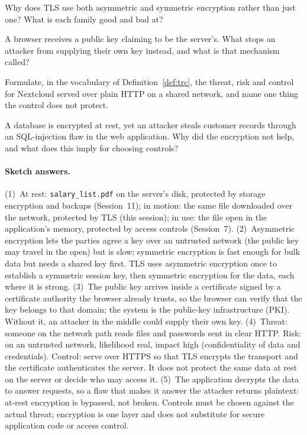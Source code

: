 \begin{exercise}
Why does TLS use both asymmetric and symmetric encryption rather than just
one? What is each family good and bad at?
\end{exercise}

\begin{exercise}
A browser receives a public key claiming to be the server's. What stops an
attacker from supplying their own key instead, and what is that mechanism
called?
\end{exercise}

\begin{exercise}
Formulate, in the vocabulary of Definition~\ref{def:trc}, the threat, risk and
control for Nextcloud served over plain HTTP on a shared network, and name one
thing the control does not protect.
\end{exercise}

\begin{exercise}
A database is encrypted at rest, yet an attacker steals customer records
through an SQL-injection flaw in the web application. Why did the encryption
not help, and what does this imply for choosing controls?
\end{exercise}

\paragraph{Sketch answers.}
{\small
(1)~At rest: \texttt{salary\_list.pdf} on the server's disk, protected by
storage encryption and backups (Session~11); in motion: the same file
downloaded over the network, protected by TLS (this session); in use: the file
open in the application's memory, protected by access controls (Session~7).
(2)~Asymmetric encryption lets the parties agree a key over an untrusted
network (the public key may travel in the open) but is slow; symmetric
encryption is fast enough for bulk data but needs a shared key first. TLS uses
asymmetric encryption once to establish a symmetric session key, then
symmetric encryption for the data, each where it is strong. (3)~The public key
arrives inside a certificate signed by a certificate authority the browser
already trusts, so the browser can verify that the key belongs to that domain;
the system is the public-key infrastructure (PKI). Without it, an attacker in the middle could supply their own key. (4)~Threat: someone on the network path
reads files and passwords sent in clear HTTP. Risk: on an untrusted network,
likelihood real, impact high (confidentiality of data and credentials).
Control: serve over HTTPS so that TLS encrypts the transport and the
certificate authenticates the server. It does not protect the same data at
rest on the server or decide who may access it. (5)~The application decrypts
the data to answer requests, so a flaw that makes it answer the attacker
returns plaintext: at-rest encryption is bypassed, not broken. Controls must
be chosen against the actual threat; encryption is one layer and does not
substitute for secure application code or access control.}



